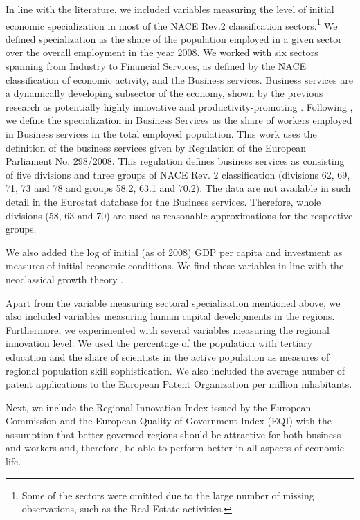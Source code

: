 \documentclass[11pt]{article}
\begin{document}
In line with the literature, we included variables measuring the level of initial economic specialization in most of the NACE Rev.2 classification sectors.\footnote{Some of the sectors were omitted due to the large number of missing observations, such as the Real Estate activities.} We defined specialization as the share of the population employed in a given sector over the overall employment in the year 2008. We worked with six sectors spanning from Industry to Financial Services, as defined by the NACE classification of economic activity, and the Business services. Business services are a dynamically developing subsector of the economy, shown by the previous research as potentially highly innovative and productivity-promoting \citep{corrocher2014kibs}. Following \citet{guastella2015knowledge}, we define the specialization in Business Services as the share of workers employed in Business services in the total employed population. This work uses the definition of the business services given by Regulation of the European Parliament No. 298/2008. This regulation defines business services as consisting of five divisions and three groups of NACE Rev. 2 classification (divisions 62, 69, 71, 73 and 78 and groups 58.2, 63.1 and 70.2). The data are not available in such detail in the Eurostat database for the Business services. Therefore, whole divisions (58, 63 and 70) are used as reasonable approximations for the respective groups.

We also added the log of initial (as of 2008) GDP per capita and investment as measures of initial economic conditions. We find these variables in line with the neoclassical growth theory \cite{iammarino2017regional}.

Apart from the variable measuring sectoral specialization mentioned above, we also included variables measuring human capital developments in the regions. Furthermore, we experimented with several variables measuring the regional innovation level. We used the percentage of the population with tertiary education and the share of scientists in the active population as measures of regional population skill sophistication. We also included the average number of patent applications to the European Patent Organization per million inhabitants. 

Next, we include the Regional Innovation Index issued by the European Commission and the European Quality of Government Index (EQI) with the assumption that better-governed regions should be attractive for both business and workers and, therefore, be able to perform better in all aspects of economic life.
\end{document}
